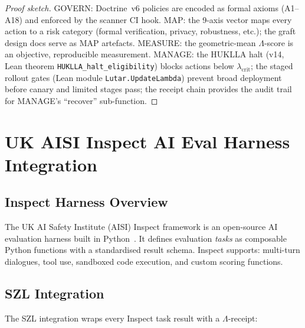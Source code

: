 \begin{proof}[Proof sketch]
  GOVERN: Doctrine~v6 policies are encoded as formal axioms (A1--A18) and
  enforced by the scanner CI hook.  MAP: the 9-axis vector maps every action
  to a risk category (formal verification, privacy, robustness, etc.);
  the graft design docs serve as MAP artefacts.  MEASURE: the geometric-mean
  $\Lambda$-score is an objective, reproducible measurement.  MANAGE: the
  HUKLLA halt (v14, Lean theorem \texttt{HUKLLA\_halt\_eligibility}) blocks
  actions below $\lambda_{\mathrm{crit}}$; the staged rollout gates
  (Lean module \texttt{Lutar.UpdateLambda}) prevent broad deployment
  before canary and limited stages pass; the receipt chain provides the
  audit trail for MANAGE's ``recover'' sub-function.
\end{proof}

\section{UK AISI Inspect AI Eval Harness Integration}
\label{sec:aisi-inspect}

\subsection{Inspect Harness Overview}
\label{ssec:inspect-overview}

The UK AI Safety Institute (AISI) Inspect framework is an open-source AI
evaluation harness built in Python~\cite{uk_aisi_inspect}.  It defines
evaluation \emph{tasks} as composable Python functions with a standardised
result schema.  Inspect supports: multi-turn dialogues, tool use, sandboxed
code execution, and custom scoring functions.

\subsection{SZL Integration}
\label{ssec:inspect-szl}

The SZL integration wraps every Inspect task result with a $\Lambda$-receipt:

